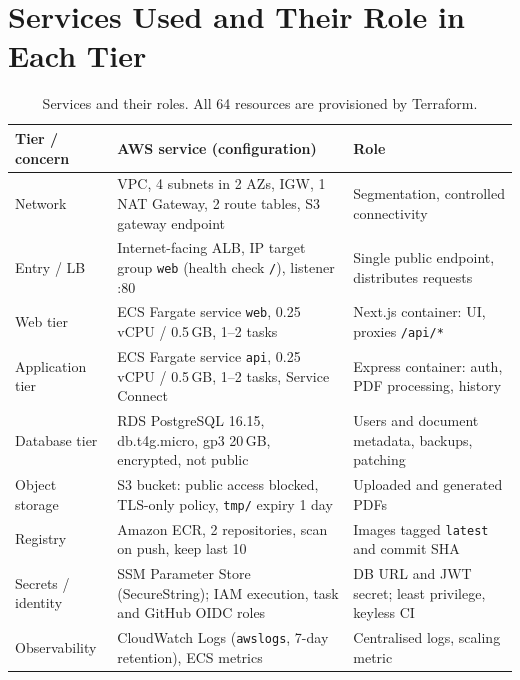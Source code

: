 \documentclass[11pt,a4paper]{article}
\begin{document}
\section{Services Used and Their Role in Each Tier}
\begin{table}[H]
\centering\footnotesize
\begin{tabularx}{\textwidth}{L{2.3cm}L{6.6cm}X}
\toprule
\textbf{Tier / concern} & \textbf{AWS service (configuration)} & \textbf{Role}\\
\midrule
Network & VPC, 4 subnets in 2 AZs, IGW, 1 NAT Gateway, 2 route tables, S3 gateway endpoint & Segmentation, controlled connectivity\\
Entry / LB & Internet-facing ALB, IP target group \texttt{web} (health check \texttt{/}), listener :80 & Single public endpoint, distributes requests\\
Web tier & ECS Fargate service \texttt{web}, 0.25 vCPU / 0.5\,GB, 1--2 tasks & Next.js container: UI, proxies \texttt{/api/*}\\
Application tier & ECS Fargate service \texttt{api}, 0.25 vCPU / 0.5\,GB, 1--2 tasks, Service Connect & Express container: auth, PDF processing, history\\
Database tier & RDS PostgreSQL 16.15, db.t4g.micro, gp3 20\,GB, encrypted, not public & Users and document metadata, backups, patching\\
Object storage & S3 bucket: public access blocked, TLS-only policy, \texttt{tmp/} expiry 1 day & Uploaded and generated PDFs\\
Registry & Amazon ECR, 2 repositories, scan on push, keep last 10 & Images tagged \texttt{latest} and commit SHA\\
Secrets / identity & SSM Parameter Store (SecureString); IAM execution, task and GitHub OIDC roles & DB URL and JWT secret; least privilege, keyless CI\\
Observability & CloudWatch Logs (\texttt{awslogs}, 7-day retention), ECS metrics & Centralised logs, scaling metric\\
\bottomrule
\end{tabularx}
\caption{Services and their roles. All 64 resources are provisioned by Terraform.}
\end{table}

\end{document}
